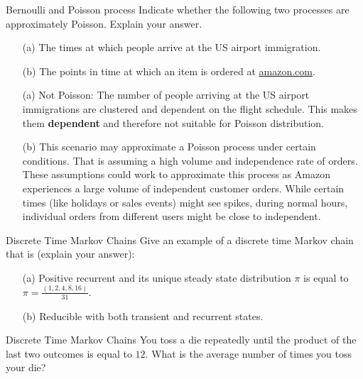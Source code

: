 \begin{problem}{Bernoulli and Poisson process} 
Indicate whether the following two processes are approximately Poisson. Explain your answer.
\begin{itemize}
\item[(a)] The times at which people arrive at the US airport immigration.
\item[(b)] The points in time at which an item is ordered at \url{amazon.com}.
\end{itemize}
\end{problem}

\begin{solution}
\begin{itemize}
\item[(a)] Not Poisson: The number of people arriving at the US airport immigrations are clustered and dependent on the flight schedule. This makes them \textbf{dependent} and therefore not suitable for Poisson distribution.
\item[(b)] This scenario may approximate a Poisson process under certain conditions. That is assuming a high volume and independence rate of orders. These assumptions could work to approximate this process as Amazon experiences a large volume of independent customer orders. While certain times (like holidays or sales events) might see spikes, during normal hours, individual orders from different users might be close to independent.
\end{itemize}
\end{solution}

\begin{problem}{Discrete Time Markov Chains}
Give an example of a discrete time Markov chain that is (explain your answer):
\begin{itemize}
    \item[(a)] Positive recurrent and its unique steady state distribution $\pi$ is equal to $\pi = \frac{(1, 2, 4, 8, 16)}{31}$.
    \item[(b)] Reducible with both transient and recurrent states.
\end{itemize}
\end{problem}

\begin{problem}{Discrete Time Markov Chains}
You toss a die repeatedly until the product of the last two outcomes is equal to $12$. What is the average number of times you toss your die?
\end{problem}


